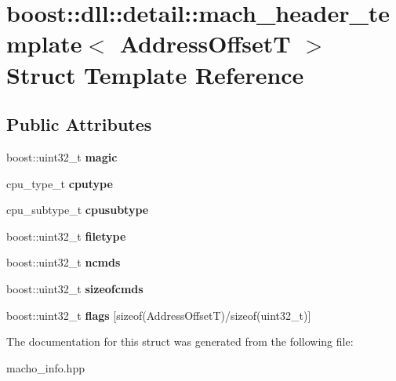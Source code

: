 \hypertarget{a01544}{}\section{boost\+:\+:dll\+:\+:detail\+:\+:mach\+\_\+header\+\_\+template$<$ Address\+OffsetT $>$ Struct Template Reference}
\label{a01544}
\subsection*{Public Attributes}
\begin{DoxyCompactItemize}
\item 
\mbox{\label{a01544_ad28ac92758c22ddda4f241518729b4ae}} 
boost\+::uint32\+\_\+t {\bfseries magic}
\item 
\mbox{\label{a01544_a00c3f4a300f9c37586b43e5b779d3e8f}} 
cpu\+\_\+type\+\_\+t {\bfseries cputype}
\item 
\mbox{\label{a01544_af2056a14bee03f3f6d9e14d877d541c7}} 
cpu\+\_\+subtype\+\_\+t {\bfseries cpusubtype}
\item 
\mbox{\label{a01544_a3d8ba6fcf26595efb2d1fefc67f2dac9}} 
boost\+::uint32\+\_\+t {\bfseries filetype}
\item 
\mbox{\label{a01544_a69b34374f6b8e4343c07d3d2aab8eaaf}} 
boost\+::uint32\+\_\+t {\bfseries ncmds}
\item 
\mbox{\label{a01544_ab6f70b88d7344ca1364dc0781e5a9efd}} 
boost\+::uint32\+\_\+t {\bfseries sizeofcmds}
\item 
\mbox{\label{a01544_aca56ac96e9d7be8dcd60db13d7ee717c}} 
boost\+::uint32\+\_\+t {\bfseries flags} \mbox{[}sizeof(Address\+OffsetT)/sizeof(uint32\+\_\+t)\mbox{]}
\end{DoxyCompactItemize}


The documentation for this struct was generated from the following file\+:\begin{DoxyCompactItemize}
\item 
macho\+\_\+info.\+hpp\end{DoxyCompactItemize}

